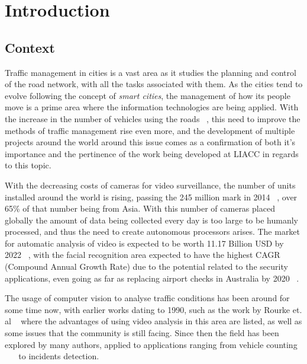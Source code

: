 
\chapter{Introduction} \label{chap:intro}

\section{Context} \label{sec:context}

Traffic management in cities is a vast area as it studies the planning and control of the road network, with all the tasks associated with them. As the cities tend to evolve following the concept of \textit{smart cities}, the management of how its people move is a prime area where the information technologies are being applied. With the increase in the number of vehicles using the roads ~\cite{navigant_transportation_2017}, this need to improve the methods of traffic management rise even more, and the development of multiple projects around the world around this issue comes as a confirmation of both it's importance and the pertinence of the work being developed at LIACC in regards to this topic.

With the decreasing costs of cameras for video surveillance, the number of units installed around the world is rising, passing the 245 million mark in 2014 ~\cite{jenkins_245_2015}, over 65\% of that number being from Asia. With this number of cameras placed globally the amount of data being collected every day is too large to be humanly processed, and thus the need to create autonomous processors arises. The market for automatic analysis of video is expected to be worth 11.17 Billion USD by 2022 ~\cite{reportlinker_global_2017}, with the facial recognition area expected to have the highest CAGR (Compound Annual Growth Rate) due to the potential related to the security applications, even going as far as replacing airport checks in Australia by 2020 ~\cite{koziol_world_2017}.

The usage of computer vision to analyse traffic conditions has been around for some time now, with earlier works dating to 1990, such as the work by Rourke et. al ~\cite{rourke_road_1990} where the advantages of using video analysis in this area are listed, as well as some issues that the community is still facing. Since then the field has been explored by many authors, applied to applications ranging from vehicle counting ~\cite{coifman_real-time_1998} ~\cite{beymer_real-time_1997} to incidents detection. 

